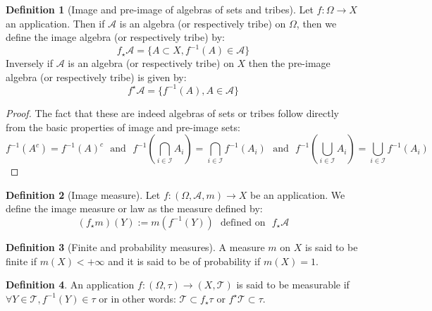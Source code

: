 \documentclass[10pt,a4paper]{book}
\theoremstyle{definition}
\newtheorem{definition}{Definition}[section]
\begin{document}
\begin{definition}[Image and pre-image of algebras of sets and tribes]

Let $f : \Omega \to X$ an application. Then if $\mathcal{A}$ is an algebra (or respectively tribe) on $\Omega$, then we define the image algebra (or respectively tribe) by:
\[
f_\star \mathcal{A} = \{ A \subset X, f^{-1}(A) \in \mathcal{A}\}
\]
Inversely if $\mathcal{A}$ is an algebra (or respectively tribe) on $X$ then the pre-image algebra (or respectively tribe) is given by:
\[
f^\star \mathcal{A} = \{ f^{-1}(A), A \in \mathcal{A}\}
\]

\end{definition}

\begin{proof}
The fact that these are indeed algebras of sets or tribes follow directly from the basic properties of image and pre-image sets:
\[
f^{-1}(A^c) = f^{-1}(A)^c \mbox{~~and~~} f^{-1}(\bigcap_{i \in \mathcal{I}} A_i) = \bigcap_{i \in \mathcal{I}} f^{-1}(A_i) \mbox{~~and~~} f^{-1}(\bigcup_{i \in \mathcal{I}} A_i) = \bigcup_{i \in \mathcal{I}} f^{-1}(A_i)
\]
\end{proof}

\begin{definition}[Image measure]

Let $f : (\Omega, \mathcal{A}, m) \to X$ be an application. We define the image measure or law as the measure defined by:
\[
(f_\star m)( Y) := m(f^{-1}(Y)) \mbox{~~defined on~~} f_\star \mathcal{A}
\]

\end{definition}

\begin{definition}[Finite and probability measures]

A measure $m$ on $X$ is said to be finite if $m(X) < +\infty$ and it is said to be of probability if $m(X) = 1$. 

\end{definition}

\begin{definition}

An application $f: (\Omega, \tau) \to (X, \mathcal{T})$ is said to be measurable if $\forall Y \in \mathcal{T}, f^{-1}(Y) \in \tau$ or in other words: $\mathcal{T} \subset f_\star \tau$ or $f^\star \mathcal{T} \subset \tau$. 
\end{definition}
\end{document}
